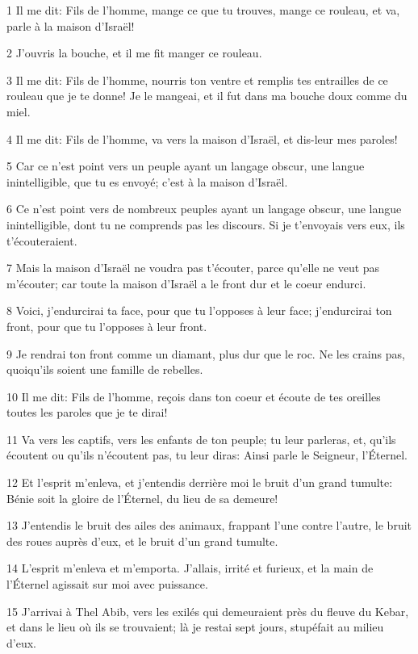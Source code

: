 \par 1 Il me dit: Fils de l'homme, mange ce que tu trouves, mange ce rouleau, et va, parle à la maison d'Israël!
\par 2 J'ouvris la bouche, et il me fit manger ce rouleau.
\par 3 Il me dit: Fils de l'homme, nourris ton ventre et remplis tes entrailles de ce rouleau que je te donne! Je le mangeai, et il fut dans ma bouche doux comme du miel.
\par 4 Il me dit: Fils de l'homme, va vers la maison d'Israël, et dis-leur mes paroles!
\par 5 Car ce n'est point vers un peuple ayant un langage obscur, une langue inintelligible, que tu es envoyé; c'est à la maison d'Israël.
\par 6 Ce n'est point vers de nombreux peuples ayant un langage obscur, une langue inintelligible, dont tu ne comprends pas les discours. Si je t'envoyais vers eux, ils t'écouteraient.
\par 7 Mais la maison d'Israël ne voudra pas t'écouter, parce qu'elle ne veut pas m'écouter; car toute la maison d'Israël a le front dur et le coeur endurci.
\par 8 Voici, j'endurcirai ta face, pour que tu l'opposes à leur face; j'endurcirai ton front, pour que tu l'opposes à leur front.
\par 9 Je rendrai ton front comme un diamant, plus dur que le roc. Ne les crains pas, quoiqu'ils soient une famille de rebelles.
\par 10 Il me dit: Fils de l'homme, reçois dans ton coeur et écoute de tes oreilles toutes les paroles que je te dirai!
\par 11 Va vers les captifs, vers les enfants de ton peuple; tu leur parleras, et, qu'ils écoutent ou qu'ils n'écoutent pas, tu leur diras: Ainsi parle le Seigneur, l'Éternel.
\par 12 Et l'esprit m'enleva, et j'entendis derrière moi le bruit d'un grand tumulte: Bénie soit la gloire de l'Éternel, du lieu de sa demeure!
\par 13 J'entendis le bruit des ailes des animaux, frappant l'une contre l'autre, le bruit des roues auprès d'eux, et le bruit d'un grand tumulte.
\par 14 L'esprit m'enleva et m'emporta. J'allais, irrité et furieux, et la main de l'Éternel agissait sur moi avec puissance.
\par 15 J'arrivai à Thel Abib, vers les exilés qui demeuraient près du fleuve du Kebar, et dans le lieu où ils se trouvaient; là je restai sept jours, stupéfait au milieu d'eux.
